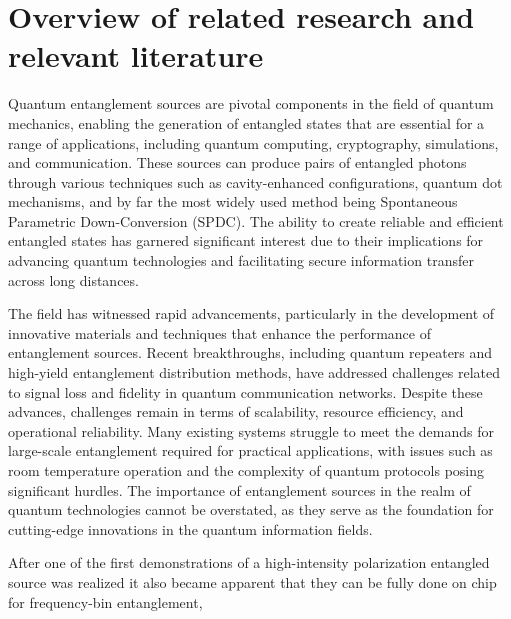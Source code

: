 \documentclass{article}
\theoremstyle{mytheoremstyle}
\theoremstyle{mytheoremstyle}
\theoremstyle{myproblemstyle}
\begin{document}
\section{Overview of related research and relevant literature}
Quantum entanglement sources are pivotal components in the field of quantum mechanics, enabling the generation of entangled states
that are essential for a range of applications, including quantum computing, cryptography, simulations, and communication.
These sources can produce pairs of entangled photons through various techniques such as cavity-enhanced configurations,
quantum dot mechanisms, and by far the most widely used method being Spontaneous Parametric Down-Conversion \cite{jesseSPDC} (SPDC).
The ability to create reliable and efficient entangled states has garnered significant interest due to their
implications for advancing quantum technologies and facilitating secure information transfer across long distances.
\par The field has witnessed rapid advancements, particularly in the development of innovative materials and techniques that enhance the
performance of entanglement sources. Recent breakthroughs, including quantum repeaters and high-yield entanglement distribution methods,
have addressed challenges related to signal loss and fidelity in quantum communication networks.
Despite these advances, challenges remain in terms of scalability, resource efficiency, and operational reliability.
Many existing systems struggle to meet the demands for large-scale entanglement required for practical applications,
with issues such as room temperature operation and the complexity of quantum protocols posing significant hurdles.
The importance of entanglement sources in the realm of quantum technologies cannot be overstated,
as they serve as the foundation for cutting-edge innovations in the quantum information fields.
\par After one of the first \cite{Kwiat_1995} demonstrations of a high-intensity polarization entangled source was realized it also
became apparent that they can be fully done on chip \cite{S_G_S_C_F_B_L_G_B_2022} for frequency-bin entanglement,
\end{document}
